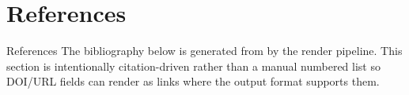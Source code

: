 \documentclass[
  ignorenonframetext,
]{beamer}
\author{\texorpdfstring{}{}}
\date{}
\begin{document}
\section{References}\label{references}

\begin{frame}{References}
The bibliography below is generated from
 by the render pipeline. This section
is intentionally citation-driven rather than a manual numbered list so
DOI/URL fields can render as links where the output format supports
them.

\nocite{dawid1979,ntqr08,allotment,stone2011,aristotle_politics,aristotle_athenian,aquinas_lots,contarini1599,montesquieu1748,rousseau1762,borda1781,condorcet1785,flanigan2021,cohen1988,efron1993,holm1979,raykar2010,karger2014,lamont2009,peters1982,cole1981,lee2013,pier2018,wenneras1997,ginther2011,kaplan2008,johnson2008,fang2016elife,merton1968,neumark2019,north2013,grofman1983,hong2004,fishkin2009,bollen2014,fang2016,avin2019,arvan2025,zheng2023,shi2025,tomkins2017,helmer2017,hardt2016,bender2021}
\end{frame}
\end{document}
